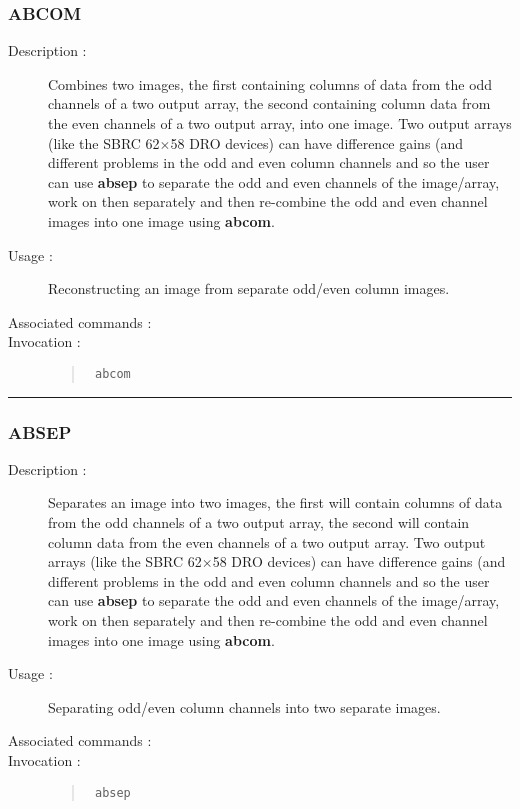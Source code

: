 \subsubsection*{\label{ABCOM}ABCOM}
\begin{description}

\item[Description :] Combines two images, the first containing columns
of data from the odd channels of a two output array, the second
containing column data from the even channels of a two output array,
into one image. Two output arrays (like the SBRC 62$\times$58 DRO
devices) can have difference gains (and different problems in the odd
and even column channels and so the user can use {\bf absep} to
separate the odd and even channels of the image/array, work on then
separately and then re-combine the odd and even channel images into one
image using {\bf abcom}.

\item[Usage :] Reconstructing an image from separate odd/even column images.

\item[Associated commands :] {\tt {}}

\item[Invocation :]
\begin{quote}{\tt
abcom}
\end{quote}

\end{description}

\hrule
\subsubsection*{\label{ABSEP}ABSEP}

\begin{description}

\item[Description :] Separates an image into two images, the first will
contain columns of data from the odd channels of a two output array,
the second will contain column data from the even channels of a two
output array.  Two output arrays (like the SBRC 62$\times$58 DRO
devices) can have difference gains (and different problems in the odd
and even column channels and so the user can use {\bf absep} to
separate the odd and even channels of the image/array, work on then
separately and then re-combine the odd and even channel images into one
image using {\bf abcom}.

\item[Usage :] Separating odd/even column channels into two separate images.

\item[Associated commands :] {\tt {}}

\item[Invocation :]
\begin{quote}{\tt
absep}
\end{quote}

\end{description}

